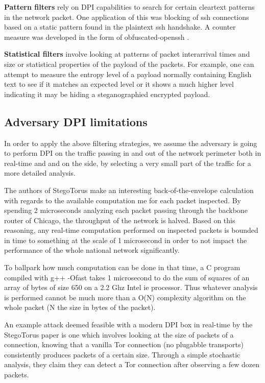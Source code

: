\documentclass[11pt]{book} %
\begin{document}
\textbf{Pattern filters} rely on DPI capabilities to search for certain cleartext patterns in the network packet. One application of this was blocking of ssh connections based on a static pattern found in the plaintext ssh handshake. A counter measure was developed in the form of obfuscated-openssh \citep*{web:obfuscatedSSHRepo}.

\textbf{Statistical filters} involve looking at patterns of packet interarrival times and size or statistical properties of the payload of the packets. For example, one can attempt to measure the entropy level of a payload normally containing English text to see if it matches an expected level or it shows a much higher level indicating it may be hiding a steganographied encrypted payload.

\subsection{Adversary DPI limitations}
\label{subsec:dpiLimitations}

In order to apply the above filtering strategies, we assume the adversary is going to perform DPI on the traffic passing in and out of the network perimeter both in real-time and and on the side, by selecting a very small part of the traffic for a more detailed analysis.

The authors of StegoTorus  \citep*{stegotorus} make an interesting back-of-the-envelope calculation with regards to the available computation me for each packet inspected. By spending 2 microseconds analyzing each packet passing through the backbone router of Chicago, the throughput of the network is halved. Based on this reasoning, any real-time computation performed on inspected packets is bounded in time to something at the scale of 1 microsecond in order to not impact the performance of the whole national network significantly.

To ballpark how much computation can be done in that time, a C program compiled with g++  -Ofast takes 1 microsecond to do the sum of squares of an array of bytes of size 650 on a 2.2 Ghz Intel ie processor. Thus whatever analysis is performed cannot be much more than a O(N) complexity algorithm on the whole packet (N the size in bytes of the packet).

An example attack deemed feasible with a modern DPI box in real-time by the StegoTorus paper is one which involves looking at the size of packets of a connection, knowing that a vanilla Tor connection (no plugabble transports) consistently produces packets of a certain size. Through a simple stochastic analysis, they claim they can detect a Tor connection after observing a few dozen packets.
\end{document}
